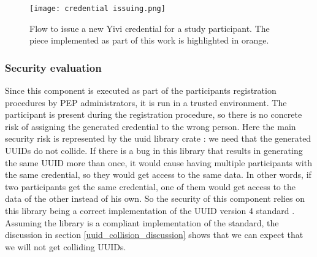 \documentclass{report}
\begin{document}
\begin{figure}[H]
		\texttt{[image: credential issuing.png]}
		\caption{Flow to issue a new Yivi credential for a study participant. The piece implemented as part of this work is highlighted in orange.}
\end{figure}

\subsubsection{Security evaluation}
Since this component is executed as part of the participants registration procedures by PEP administrators, it is run in a trusted environment. The participant is present during
the registration procedure, so there is no concrete risk of assigning the generated credential to the wrong person. Here the main security risk is represented by the uuid library crate
\cite{uuid_crate}: we need that the generated UUIDs do not collide. If there is a bug in this library that results in generating the same UUID more than once, it would cause having
multiple participants with the same credential, so they would get access to the same data. In other words, if two participants get the same credential, one of them would get access
to the data of the other instead of his own. So the security of this component relies on this library being a correct implementation of the UUID version 4 standard \cite{uuid_rfc}.
Assuming the library is a compliant implementation of the standard, the discussion in section \ref{uuid_collision_discussion} shows that we can expect that we will not get colliding UUIDs.
\end{document}
